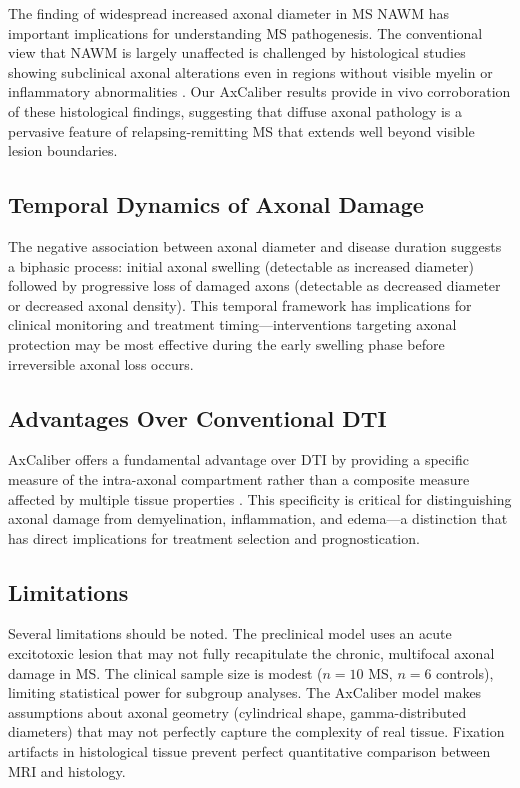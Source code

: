 \documentclass[11pt]{article}
\begin{document}
The finding of widespread increased axonal diameter in MS NAWM has important implications for understanding MS pathogenesis. The conventional view that NAWM is largely unaffected is challenged by histological studies showing subclinical axonal alterations even in regions without visible myelin or inflammatory abnormalities \citep{kutzelnigg2005cortical}. Our AxCaliber results provide in vivo corroboration of these histological findings, suggesting that diffuse axonal pathology is a pervasive feature of relapsing-remitting MS that extends well beyond visible lesion boundaries.

\subsection{Temporal Dynamics of Axonal Damage}

The negative association between axonal diameter and disease duration suggests a biphasic process: initial axonal swelling (detectable as increased diameter) followed by progressive loss of damaged axons (detectable as decreased diameter or decreased axonal density). This temporal framework has implications for clinical monitoring and treatment timing---interventions targeting axonal protection may be most effective during the early swelling phase before irreversible axonal loss occurs.

\subsection{Advantages Over Conventional DTI}

AxCaliber offers a fundamental advantage over DTI by providing a specific measure of the intra-axonal compartment rather than a composite measure affected by multiple tissue properties \citep{alexander2007diffusion}. This specificity is critical for distinguishing axonal damage from demyelination, inflammation, and edema---a distinction that has direct implications for treatment selection and prognostication.

\subsection{Limitations}

Several limitations should be noted. The preclinical model uses an acute excitotoxic lesion that may not fully recapitulate the chronic, multifocal axonal damage in MS. The clinical sample size is modest ($n = 10$ MS, $n = 6$ controls), limiting statistical power for subgroup analyses. The AxCaliber model makes assumptions about axonal geometry (cylindrical shape, gamma-distributed diameters) that may not perfectly capture the complexity of real tissue. Fixation artifacts in histological tissue prevent perfect quantitative comparison between MRI and histology.
\end{document}
